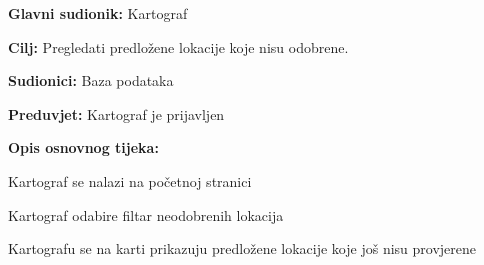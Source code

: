 					\noindent {}
					\begin{packed_item}
	
						\item \textbf{Glavni sudionik: }Kartograf
						\item  \textbf{Cilj:} Pregledati predložene lokacije koje nisu odobrene.
						\item  \textbf{Sudionici:} Baza podataka
						\item  \textbf{Preduvjet:} Kartograf je prijavljen
						\item  \textbf{Opis osnovnog tijeka:}
						
						\item[] \begin{packed_enum}
	
							\item Kartograf se nalazi na početnoj stranici
							\item Kartograf odabire filtar neodobrenih lokacija
							\item Kartografu se na karti prikazuju predložene lokacije koje još nisu provjerene

						\end{packed_enum}
						
					\end{packed_item}
					\pagebreak
					
